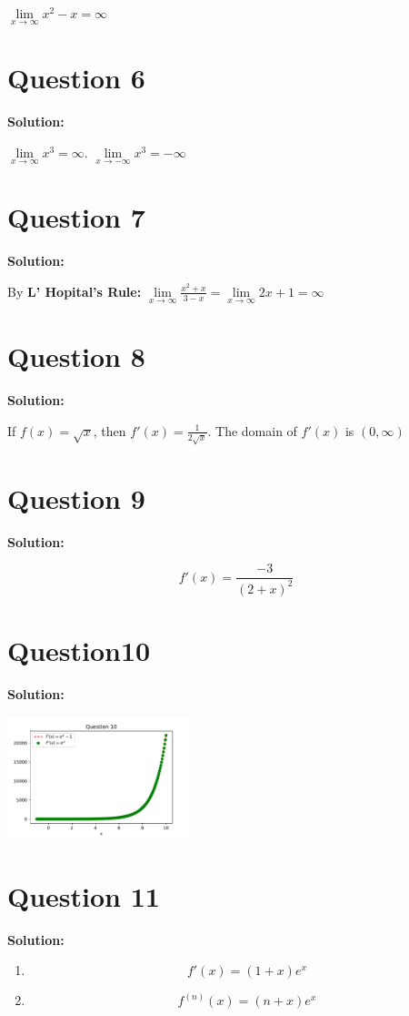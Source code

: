 \documentclass[11pt]{article} %
\begin{document}
$\lim\limits_{x\to\infty}x^2-x=\infty$

\section{Question 6}
\textbf{Solution:}

$\lim\limits_{x\to\infty}x^3=\infty$.  $\lim\limits_{x\to-\infty}x^3=-\infty$

\section{Question 7 }
\textbf{Solution:}

By \textbf{L' Hopital's Rule:} $\lim\limits_{x\to\infty}\frac{x^2+x}{3-x}=\lim\limits_{x\to\infty}2x+1=\infty$

\section{Question 8}
\textbf{Solution:}

If $f(x)=\sqrt{x}$, then $f'(x)=\frac{1}{2\sqrt{x}}$. The domain of $f'(x)$ is $\left(0,\infty\right)$

\section{Question 9}
\textbf{Solution:}

$$f'(x)=\frac{-3}{(2+x)^2}$$


\section{Question10}
\textbf{Solution:}

\includegraphics[width=0.4\textwidth, angle=0]{question10.pdf}

\section{Question 11}
\textbf{Solution:}

\begin{enumerate}
	\item $$f'(x)=(1+x)e^x$$
	\item $$f^{(n)}(x)=(n+x)e^x$$
\end{enumerate}
\end{document}
